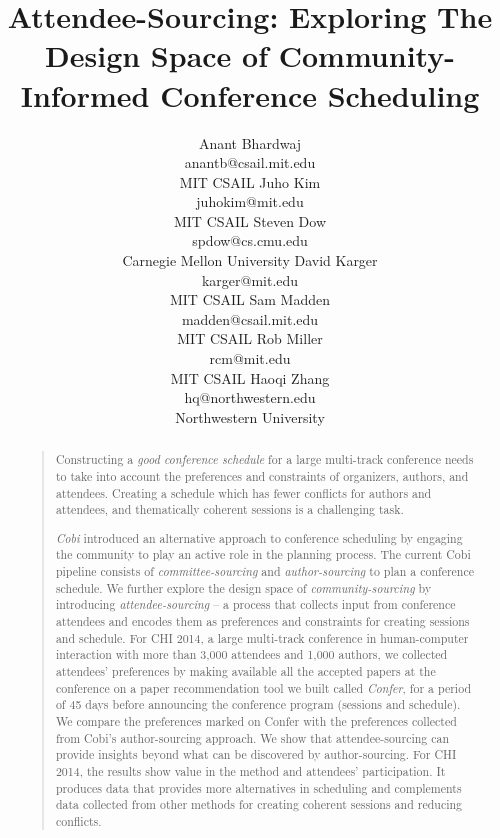 \documentclass[letterpaper]{article}
\begin{document}
%
\title{Attendee-Sourcing: Exploring The Design Space of Community-Informed Conference Scheduling}
\author{
Anant Bhardwaj \\
anantb@csail.mit.edu\\
MIT CSAIL
\And
Juho Kim\\
juhokim@mit.edu\\
MIT CSAIL
\And
Steven Dow \\
spdow@cs.cmu.edu\\
Carnegie Mellon University
\AND
David Karger \\
karger@mit.edu\\
MIT CSAIL
\And
Sam Madden \\
madden@csail.mit.edu\\
MIT CSAIL
\And
Rob Miller\\
rcm@mit.edu\\
MIT CSAIL
\And
Haoqi Zhang \\
hq@northwestern.edu\\
Northwestern University
}
\maketitle
\begin{abstract}
\begin{quote}
Constructing a \emph{good conference schedule} for a large multi-track conference needs to take into account the preferences and constraints of organizers, authors, and attendees. Creating a schedule which has fewer conflicts for authors and attendees, and thematically coherent sessions is a challenging task. 

\emph{Cobi} introduced an alternative approach to conference scheduling by engaging the community to play an active role in the planning process. The current Cobi pipeline consists of \emph{committee-sourcing} and \emph{author-sourcing} to plan a conference schedule. We further explore the design space of \emph{community-sourcing} by introducing \emph{attendee-sourcing} -- a process that collects input from conference attendees and encodes them as preferences and constraints for creating sessions and schedule.  For CHI 2014, a large multi-track conference in human-computer interaction with more than 3,000 attendees and 1,000 authors, we collected attendees' preferences by making available all the accepted papers at the conference on a paper recommendation tool we built called \emph{Confer}, for a period of 45 days before announcing the conference program (sessions and schedule). We compare the preferences marked on Confer with the preferences collected from Cobi's author-sourcing approach. We show that attendee-sourcing can provide insights beyond what can be discovered by author-sourcing. For CHI 2014, the results show value in the method and attendees' participation. It produces data that provides more alternatives in scheduling and complements data collected from other methods for creating coherent sessions and reducing conflicts.
\end{quote}
\end{abstract}
\end{document}
